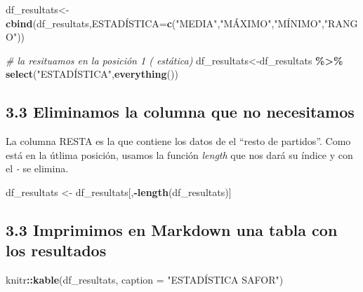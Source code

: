 \documentclass[
]{article}
\newenvironment{Shaded}{\begin{snugshade}}{\end{snugshade}}
\newcommand{\AttributeTok}[1]{\textcolor[rgb]{0.13,0.29,0.53}{#1}}
\newcommand{\CommentTok}[1]{\textcolor[rgb]{0.56,0.35,0.01}{\textit{#1}}}
\newcommand{\FunctionTok}[1]{\textcolor[rgb]{0.13,0.29,0.53}{\textbf{#1}}}
\newcommand{\NormalTok}[1]{#1}
\newcommand{\OtherTok}[1]{\textcolor[rgb]{0.56,0.35,0.01}{#1}}
\newcommand{\SpecialCharTok}[1]{\textcolor[rgb]{0.81,0.36,0.00}{\textbf{#1}}}
\newcommand{\StringTok}[1]{\textcolor[rgb]{0.31,0.60,0.02}{#1}}
\begin{document}
\begin{Shaded}
\begin{Highlighting}[]
\NormalTok{df\_resultats}\OtherTok{\textless{}{-}}\FunctionTok{cbind}\NormalTok{(df\_resultats,ESTADÍSTICA}\OtherTok{=}\FunctionTok{c}\NormalTok{(}\StringTok{"MEDIA"}\NormalTok{,}\StringTok{"MÁXIMO"}\NormalTok{,}\StringTok{"MÍNIMO"}\NormalTok{,}\StringTok{"RANGO"}\NormalTok{))}
\end{Highlighting}
\end{Shaded}

\begin{Shaded}
\begin{Highlighting}[]
\CommentTok{\# la resituamos en la posición 1 ( estática)}
\NormalTok{df\_resultats}\OtherTok{\textless{}{-}}\NormalTok{df\_resultats }\SpecialCharTok{\%\textgreater{}\%} \FunctionTok{select}\NormalTok{(}\StringTok{"ESTADÍSTICA"}\NormalTok{,}\FunctionTok{everything}\NormalTok{())}
\end{Highlighting}
\end{Shaded}

\hypertarget{eliminamos-la-columna-que-no-necesitamos}{%
\subsection{3.3 Eliminamos la columna que no
necesitamos}\label{eliminamos-la-columna-que-no-necesitamos}}

La columna RESTA es la que contiene los datos de el ``resto de
partidos''. Como está en la útlima posición, usamos la función
\emph{length} que nos dará su índice y con el \emph{-} se elimina.

\begin{Shaded}
\begin{Highlighting}[]
\NormalTok{df\_resultats }\OtherTok{\textless{}{-}}\NormalTok{ df\_resultats[,}\SpecialCharTok{{-}}\FunctionTok{length}\NormalTok{(df\_resultats)]}
\end{Highlighting}
\end{Shaded}

\hypertarget{imprimimos-en-markdown-una-tabla-con-los-resultados}{%
\subsection{3.3 Imprimimos en Markdown una tabla con los
resultados}\label{imprimimos-en-markdown-una-tabla-con-los-resultados}}

\begin{Shaded}
\begin{Highlighting}[]
\NormalTok{knitr}\SpecialCharTok{::}\FunctionTok{kable}\NormalTok{(df\_resultats, }\AttributeTok{caption =} \StringTok{"ESTADÍSTICA SAFOR"}\NormalTok{)}
\end{Highlighting}
\end{Shaded}
\end{document}
